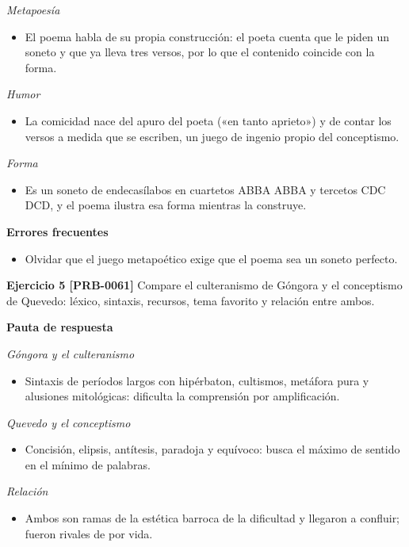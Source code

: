 \documentclass{book}
\begin{document}
\noindent\textit{Metapoesía}
\begin{itemize}
\item El poema habla de su propia construcción: el poeta cuenta que le piden un soneto y que ya lleva tres versos, por lo que el contenido coincide con la forma.
\end{itemize}

\noindent\textit{Humor}
\begin{itemize}
\item La comicidad nace del apuro del poeta («en tanto aprieto») y de contar los versos a medida que se escriben, un juego de ingenio propio del conceptismo.
\end{itemize}

\noindent\textit{Forma}
\begin{itemize}
\item Es un soneto de endecasílabos en cuartetos ABBA ABBA y tercetos CDC DCD, y el poema ilustra esa forma mientras la construye.
\end{itemize}

\noindent\textbf{Errores frecuentes}
\begin{itemize}
\item Olvidar que el juego metapoético exige que el poema sea un soneto perfecto.
\end{itemize}

\noindent\textbf{Ejercicio 5 [PRB-0061]}
Compare el culteranismo de Góngora y el conceptismo de Quevedo: léxico, sintaxis, recursos, tema favorito y relación entre ambos.


\noindent\textbf{Pauta de respuesta}

\noindent\textit{Góngora y el culteranismo}
\begin{itemize}
\item Sintaxis de períodos largos con hipérbaton, cultismos, metáfora pura y alusiones mitológicas: dificulta la comprensión por amplificación.
\end{itemize}

\noindent\textit{Quevedo y el conceptismo}
\begin{itemize}
\item Concisión, elipsis, antítesis, paradoja y equívoco: busca el máximo de sentido en el mínimo de palabras.
\end{itemize}

\noindent\textit{Relación}
\begin{itemize}
\item Ambos son ramas de la estética barroca de la dificultad y llegaron a confluir; fueron rivales de por vida.
\end{itemize}
\end{document}
